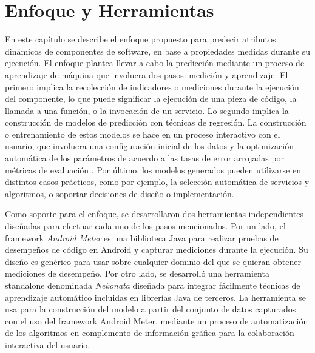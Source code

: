 \newcommand*{\mtol}{This is some more text than fit at ony line but only some   and not a lot}
\newenvironment{mldescription}{%
\begin{addmargin}[2.5em]{0em}     
\setlength{\parindent}{-2.5em}%
\newcommand*{\mlitem}[1]{\par\textbf{##1}\quad}\indent 
}{%
\end{addmargin}   
\medskip }


\chapter{Enfoque y Herramientas\label{chap:Enfoque-y-Herramientas}}

En este capítulo se describe el enfoque propuesto para predecir atributos
dinámicos de componentes de software, en base a propiedades medidas
durante su ejecución. El enfoque plantea llevar a cabo la predicción
mediante un proceso de aprendizaje de máquina que involucra dos pasos:
medición y aprendizaje. El primero implica la recolección de indicadores
o mediciones durante la ejecución del componente, lo que puede significar
la ejecución de una pieza de código, la llamada a una función, o la
invocación de un servicio. Lo segundo implica la construcción de
modelos de predicción con técnicas de regresión. La construcción o
entrenamiento de estos modelos se hace en un proceso interactivo con
el usuario, que involucra una configuración inicial de los datos y
la optimización automática de los parámetros de acuerdo a las tasas
de error arrojadas por métricas de evaluación . Por último, los modelos
generados pueden utilizarse en distintos casos prácticos, como por
ejemplo, la selección automática de servicios y algoritmos, o soportar
decisiones de diseño o implementación. 

Como soporte para el enfoque, se desarrollaron dos herramientas independientes
diseñadas para efectuar cada uno de los pasos mencionados. Por un
lado, el framework\emph{ Android Meter} es una biblioteca Java para
realizar pruebas de desempeños de código en Android y capturar mediciones
durante la ejecución. Su diseño es genérico para usar sobre cualquier
dominio del que se quieran obtener mediciones de desempeño. Por otro
lado, se desarrolló una herramienta standalone denominada \emph{Nekonata}
diseñada para integrar fácilmente técnicas de aprendizaje automático
incluidas en librerías Java de terceros. La herramienta se usa para
la construcción del modelo a partir del conjunto de datos capturados
con el uso del framework Android Meter, mediante un proceso de automatización
de los algoritmos en complemento de información gráfica para la colaboración
interactiva del usuario. 

